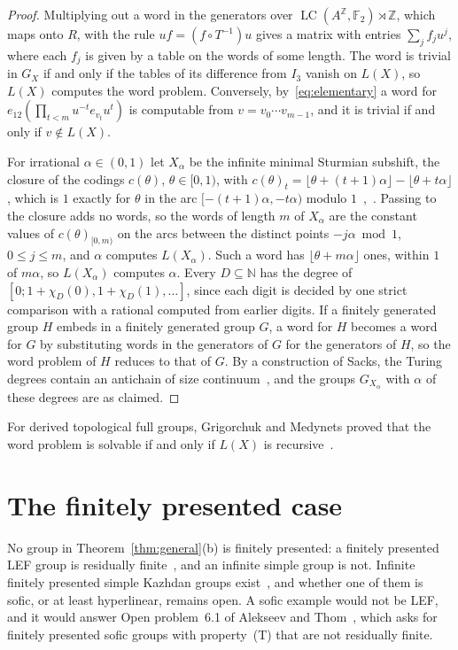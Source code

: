 \documentclass[11pt]{amsart}
\newcommand{\F}{\mathbb F}
\newcommand{\Z}{\mathbb Z}
\newcommand{\LC}{\operatorname{LC}}
\begin{document}
\begin{proof}
Multiplying out a word in the generators over $\LC(A^{\Z},\F_2)\rtimes\Z$,
which maps onto $R$, with the rule $uf=(f\circ T^{-1})u$ gives a matrix
with entries $\sum_jf_ju^j$, where each $f_j$ is given by a table on the
words of some length. The word is trivial in $G_X$ if and only if the
tables of its difference from $I_3$ vanish on $L(X)$, so $L(X)$ computes
the word problem. Conversely, by~\eqref{eq:elementary} a word for
$e_{12}(\prod_{t<m}u^{-t}e_{v_t}u^t)$ is computable from
$v=v_0\cdots v_{m-1}$, and it is trivial if and only if $v\notin L(X)$.

For irrational $\alpha\in(0,1)$ let $X_\alpha$ be the infinite minimal
Sturmian subshift, the closure of the codings $c(\theta)$,
$\theta\in[0,1)$, with
$c(\theta)_t=\lfloor\theta+(t+1)\alpha\rfloor-\lfloor\theta+t\alpha\rfloor$,
which is $1$ exactly for $\theta$ in the arc $[-(t+1)\alpha,-t\alpha)$
modulo $1$~\cite{MorseHedlund,Hedlund44},~\cite[Chapter~2]{Lothaire}.
Passing to the closure adds no words, so the words of length $m$ of
$X_\alpha$ are the constant values of $c(\theta)_{[0,m)}$ on the arcs
between the distinct points $-j\alpha\bmod1$, $0\le j\le m$, and $\alpha$
computes $L(X_\alpha)$. Such a word has $\lfloor\theta+m\alpha\rfloor$
ones, within $1$ of $m\alpha$, so $L(X_\alpha)$ computes $\alpha$. Every
$D\subseteq\mathbb N$ has the degree of
$[0;1+\chi_D(0),1+\chi_D(1),\dots]$, since each digit is decided by one
strict comparison with a rational computed from earlier digits.
If a finitely generated group $H$ embeds in a finitely generated group
$G$, a word for $H$ becomes a word for $G$ by substituting words in the
generators of $G$ for the generators of $H$, so the word problem of $H$
reduces to that of $G$. By a construction of Sacks, the Turing degrees
contain an antichain of size continuum~\cite[Chapter~V]{Odifreddi}, and the
groups $G_{X_\alpha}$ with $\alpha$ of these degrees are as claimed.
\end{proof}

For derived topological full groups, Grigorchuk and Medynets proved that
the word problem is solvable if and only if $L(X)$ is
recursive~\cite[Theorem~1.1(3)]{GMpres}.

\section{The finitely presented case}\label{sec:questions}

No group in Theorem~\ref{thm:general}\textup{(b)} is finitely presented:
a finitely presented LEF group is residually
finite~\cite{Stepin,VershikGordon}, and an infinite simple group is not.
Infinite finitely presented simple Kazhdan groups
exist~\cite{CapraceRemy}, and whether one of them is sofic, or at least
hyperlinear, remains open. A sofic example would not be LEF, and it would
answer Open problem~6.1 of Alekseev and Thom~\cite{AlekseevThom}, which
asks for finitely presented sofic groups with property~\textup{(T)} that
are not residually finite.
\end{document}
